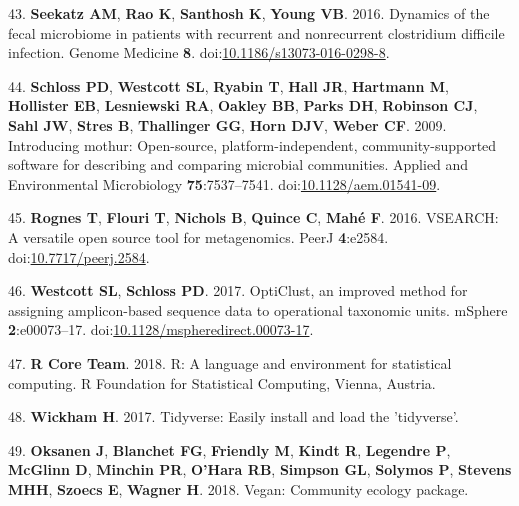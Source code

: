 \documentclass[11pt,]{article}
\begin{document}
\leavevmode\hypertarget{ref-Seekatz2016}{}%
43. \textbf{Seekatz AM}, \textbf{Rao K}, \textbf{Santhosh K},
\textbf{Young VB}. 2016. Dynamics of the fecal microbiome in patients
with recurrent and nonrecurrent clostridium difficile infection. Genome
Medicine \textbf{8}.
doi:\href{https://doi.org/10.1186/s13073-016-0298-8}{10.1186/s13073-016-0298-8}.

\leavevmode\hypertarget{ref-Schloss2009}{}%
44. \textbf{Schloss PD}, \textbf{Westcott SL}, \textbf{Ryabin T},
\textbf{Hall JR}, \textbf{Hartmann M}, \textbf{Hollister EB},
\textbf{Lesniewski RA}, \textbf{Oakley BB}, \textbf{Parks DH},
\textbf{Robinson CJ}, \textbf{Sahl JW}, \textbf{Stres B},
\textbf{Thallinger GG}, \textbf{Horn DJV}, \textbf{Weber CF}. 2009.
Introducing mothur: Open-source, platform-independent,
community-supported software for describing and comparing microbial
communities. Applied and Environmental Microbiology
\textbf{75}:7537--7541.
doi:\href{https://doi.org/10.1128/aem.01541-09}{10.1128/aem.01541-09}.

\leavevmode\hypertarget{ref-Rognes2016}{}%
45. \textbf{Rognes T}, \textbf{Flouri T}, \textbf{Nichols B},
\textbf{Quince C}, \textbf{Mahé F}. 2016. VSEARCH: A versatile open
source tool for metagenomics. PeerJ \textbf{4}:e2584.
doi:\href{https://doi.org/10.7717/peerj.2584}{10.7717/peerj.2584}.

\leavevmode\hypertarget{ref-Westcott2017}{}%
46. \textbf{Westcott SL}, \textbf{Schloss PD}. 2017. OptiClust, an
improved method for assigning amplicon-based sequence data to
operational taxonomic units. mSphere \textbf{2}:e00073--17.
doi:\href{https://doi.org/10.1128/mspheredirect.00073-17}{10.1128/mspheredirect.00073-17}.

\leavevmode\hypertarget{ref-r_citation_2018}{}%
47. \textbf{R Core Team}. 2018. R: A language and environment for
statistical computing. R Foundation for Statistical Computing, Vienna,
Austria.

\leavevmode\hypertarget{ref-Tidyverse2017}{}%
48. \textbf{Wickham H}. 2017. Tidyverse: Easily install and load the
'tidyverse'.

\leavevmode\hypertarget{ref-Vegan2018}{}%
49. \textbf{Oksanen J}, \textbf{Blanchet FG}, \textbf{Friendly M},
\textbf{Kindt R}, \textbf{Legendre P}, \textbf{McGlinn D},
\textbf{Minchin PR}, \textbf{O'Hara RB}, \textbf{Simpson GL},
\textbf{Solymos P}, \textbf{Stevens MHH}, \textbf{Szoecs E},
\textbf{Wagner H}. 2018. Vegan: Community ecology package.

\newpage
\end{document}
